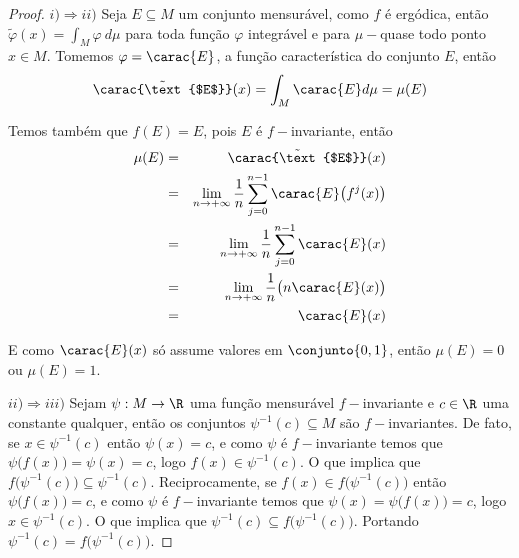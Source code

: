 \begin{proof} $i) \Rightarrow ii)$ Seja $E\subseteq M$ um conjunto mensurável, como $f$ é ergódica, então $\tilde{\varphi}(x)=\int_{M}\varphi\ d\mu$ para toda função $\varphi$ integrável e para $\mu-$quase todo ponto $x\in M$. Tomemos $\varphi=\carac{E}$, a função característica do conjunto $E$, então
\begin{equation*}
\tilde{\carac{\text{$E$}}}(x)=\int_{M}\carac{E}d\mu=\mu(E)
\end{equation*}

Temos também que $f(E)=E$, pois $E$ é $f-$invariante, então
\begin{eqnarray*}
\mu(E) & = & \tilde{\carac{\text{$E$}}}(x)\\
& = & \lim_{n\to+\infty}\dfrac{1}{n}\sum_{j=0}^{n-1}{\carac{E}\big(f^j(x)\big)}\\
& = & \lim_{n\to+\infty}\dfrac{1}{n}\sum_{j=0}^{n-1}{\carac{E}(x)}\\
& = & \lim_{n\to+\infty}\dfrac{1}{n}\big(n{\carac{E}(x)\big)}\\
& = & \carac{E}(x)
\end{eqnarray*}

E como $\carac{E}(x)$ só assume valores em $\conjunto{0,1}$, então $\mu(E)=0$ ou $\mu(E)=1$.

$ii) \Rightarrow iii)$ Sejam $\psi:M\to\R$ uma função mensurável $f-$invariante e $c\in\R$ uma constante qualquer, então os conjuntos $\psi^{-1}(c)\subseteq M$ são $f-$invariantes. De fato, se $x\in\psi^{-1}(c)$ então $\psi(x)=c$, e como $\psi$ é $f-$invariante temos que $\psi\big(f(x)\big)=\psi(x)=c$, logo $f(x)\in\psi^{-1}(c)$. O que implica que $f\big(\psi^{-1}(c)\big)\subseteq \psi^{-1}(c)$. Reciprocamente, se $f(x)\in f\big(\psi^{-1}(c)\big)$ então $\psi\big(f(x)\big)=c$, e como $\psi$ é $f-$invariante temos que $\psi(x)=\psi\big(f(x)\big)=c$, logo $x\in\psi^{-1}(c)$. O que implica que $\psi^{-1}(c)\subseteq f\big(\psi^{-1}(c)\big)$. Portando $\psi^{-1}(c)=f\big(\psi^{-1}(c)\big)$.



\end{proof}
